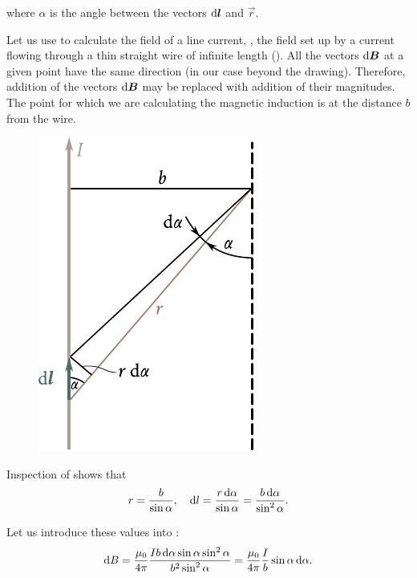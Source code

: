 \noindent
where $\alpha$ is the angle between the vectors $\mathrm{d}\boldsymbol{l}$ and $\vec{r}$.

Let us use  to calculate the field of a line current, \ie, the field set up by a current flowing through a thin straight wire of infinite length (). All the vectors $\mathrm{d}\boldsymbol{B}$ at a given point have the same direction (in our case beyond the drawing). Therefore, addition of the vectors $\mathrm{d}\boldsymbol{B}$ may be replaced with addition of their magnitudes. The point for which we are calculating the magnetic induction is at the distance $b$ from the wire.

\begin{figure}[t]
	\begin{center}
		\includegraphics[scale=1]{figures/ch_06/fig_6_4.pdf}
		\caption[]{}
		\label{fig:6_4}
	\end{center}
	\vspace{-0.8cm}
\end{figure}

Inspection of  shows that
\begin{equation*}
    r = \frac{b}{\sin\alpha},\quad \mathrm{d} l = \frac{r\, \mathrm{d}\alpha}{\sin\alpha} = \frac{b\, \mathrm{d}\alpha}{\sin^2\alpha}.
\end{equation*}

\noindent
Let us introduce these values into :
\begin{equation*}
    \mathrm{d} B = \frac{\mu_0}{4\pi} \frac{Ib\, \mathrm{d}\alpha \sin\alpha \sin^2\alpha}{b^2 \sin^2\alpha} = \frac{\mu_0}{4\pi} \frac{I}{b} \sin\alpha\, \mathrm{d}\alpha.
\end{equation*}


